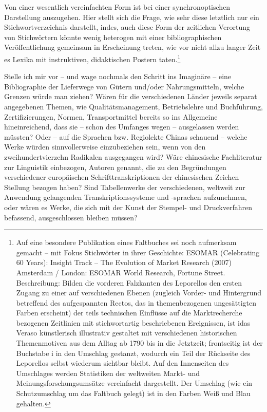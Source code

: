 \documentclass[a4paper,
fontsize=11pt,
oneside,
numbers=noperiodatend,
parskip=half-,
bibliography=totoc,
final
]{scrartcl}
\begin{document}
Von einer wesentlich vereinfachten Form ist bei einer synchronoptischen
Darstellung auszugehen. Hier stellt sich die Frage, wie sehr diese
letztlich nur ein Stichwortverzeichnis darstellt, indes, auch diese Form
der zeitlichen Verortung von Stichwörtern könnte wenig heterogen mit
einer bibliographischen Veröffentlichung gemeinsam in Erscheinung
treten, wie vor nicht allzu langer Zeit es Lexika mit instruktiven,
didaktischen Postern taten.\footnote{Auf eine besondere Publikation
  eines Faltbuches sei noch aufmerksam gemacht -- mit Fokus Stichwörter
  in ihrer Geschichte: ESOMAR (Celebrating 60 Years): Insight Track --
  The Evolution of Market Research (2007) Amsterdam / London: ESOMAR
  World Research, Fortune Street. Beschreibung: Bilden die vorderen
  Falzkanten des Leporellos den ersten Zugang zu einer auf verschiedenen
  Ebenen (zugleich Vorder- und Hintergrund betreffend des aufgespannten
  Rectos, das in themenbezogenen ungesättigten Farben erscheint) der
  teils technischen Einflüsse auf die Marktrecherche bezogenen
  Zeitlinien mit stichwortartig beschriebenen Ereignissen, ist idas
  Veraso künstlerisch illustrativ gestaltet mit verschiedenen
  historischen Themenmotiven aus dem Alltag ab 1790 bis in die
  Jetztzeit; frontseitig ist der Buchstabe i in den Umschlag gestanzt,
  wodurch ein Teil der Rückseite des Leporellos selbst wiederum sichtbar
  bleibt. Auf den Innenseiten des Umschlages werden Statistiken der
  weltweiten Markt- und Meinungsforschungsumsätze vereinfacht
  dargestellt. Der Umschlag (wie ein Schutzumschlag um das Faltbuch
  gelegt) ist in den Farben Weiß und Blau gehalten.}

Stelle ich mir vor -- und wage nochmals den Schritt ins Imaginäre --
eine Bibliographie der Lieferwege von Gütern und/oder Nahrungsmitteln,
welche Grenzen würde man ziehen? Wären für die verschiedenen Länder
jeweils separat angegebenen Themen, wie Qualitätsmanagement,
Betriebslehre und Buchführung, Zertifizierungen, Normen, Transportmittel
bereits so ins Allgemeine hineinreichend, dass sie -- schon des Umfanges
wegen -- ausgelassen werden müssten? Oder -- auf die Sprachen bzw.
Regiolekte Chinas schauend -- welche Werke würden sinnvollerweise
einzubeziehen sein, wenn von den zweihundertvierzehn Radikalen
ausgegangen wird? Wäre chinesische Fachliteratur zur Linguistik
einbezogen, Autoren genannt, die zu den Begründungen verschiedener
europäischen Schrifttranskriptionen der chinesischen Zeichen Stellung
bezogen haben? Sind Tabellenwerke der verschiedenen, weltweit zur
Anwendung gelangenden Transkriptionssysteme und -sprachen aufzunehmen,
oder wären es Werke, die sich mit der Kunst der Stempel- und
Druckverfahren befassend, ausgeschlossen bleiben müssen?
\end{document}
